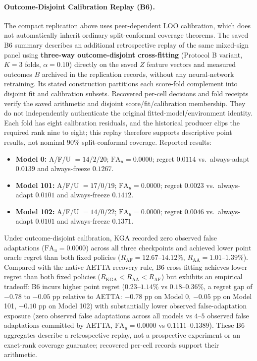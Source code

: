 \paragraph{Outcome-Disjoint Calibration Replay (B6).}
The compact replication above uses peer-dependent LOO calibration, which does not automatically inherit ordinary split-conformal coverage theorems. The saved B6 summary describes an additional retrospective replay of the same mixed-sign panel using \textbf{three-way outcome-disjoint cross-fitting} (Protocol B variant, $K=3$ folds, $\alpha = 0.10$) directly on the saved $Z$ feature vectors and measured outcomes $B$ archived in the replication records, without any neural-network retraining. Its stated construction partitions each score-fold complement into disjoint fit and calibration subsets. Recovered per-cell decisions and fold receipts verify the saved arithmetic and disjoint score/fit/calibration membership. They do not independently authenticate the original fitted-model/environment identity. Each fold has eight calibration residuals, and the historical producer clips the required rank nine to eight; this replay therefore supports descriptive point results, not nominal $90\%$ split-conformal coverage. Reported results:
\begin{itemize}
  \item \textbf{Model 0:} A/F/U $= 14/2/20$; $\mathrm{FA}_u = 0.0000$; regret $0.0114$ vs.\ always-adapt $0.0139$ and always-freeze $0.1267$.
  \item \textbf{Model 101:} A/F/U $= 17/0/19$; $\mathrm{FA}_u = 0.0000$; regret $0.0023$ vs.\ always-adapt $0.0101$ and always-freeze $0.1412$.
  \item \textbf{Model 102:} A/F/U $= 14/0/22$; $\mathrm{FA}_u = 0.0000$; regret $0.0046$ vs.\ always-adapt $0.0101$ and always-freeze $0.1371$.
\end{itemize}
Under outcome-disjoint calibration, KGA recorded zero observed false adaptations ($\mathrm{FA}_u = 0.0000$) across all three checkpoints and achieved lower point oracle regret than both fixed policies ($R_{\mathrm{AF}} = 12.67$--$14.12\%$, $R_{\mathrm{AA}} = 1.01$--$1.39\%$). Compared with the native AETTA recovery rule, B6 cross-fitting achieves lower regret than both fixed policies ($R_{\mathrm{KGA}} < R_{\mathrm{AA}} < R_{\mathrm{AF}}$) but exhibits an empirical tradeoff: B6 incurs higher point regret ($0.23$--$1.14\%$ vs $0.18$--$0.36\%$, a regret gap of $-0.78$ to $-0.05\text{ pp}$ relative to AETTA: $-0.78\text{ pp}$ on Model 0, $-0.05\text{ pp}$ on Model 101, $-0.10\text{ pp}$ on Model 102) with substantially lower observed false-adaptation exposure (zero observed false adaptations across all models vs $4$--$5$ observed false adaptations committed by AETTA, $\mathrm{FA}_u = 0.0000$ vs $0.1111$--$0.1389$). These B6 aggregates describe a retrospective replay, not a prospective experiment or an exact-rank coverage guarantee; recovered per-cell records support their arithmetic.

